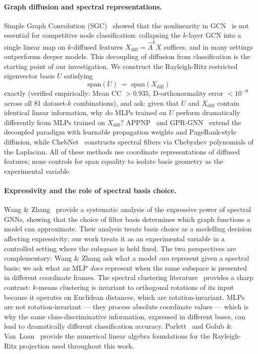 \documentclass[11pt]{article}
\begin{document}
\paragraph{Graph diffusion and spectral representations.}
Simple Graph Convolution (SGC)~\citep{wu2019simplifying} showed that the
nonlinearity in GCN~\citep{kipf2017semi} is not essential for competitive
node classification: collapsing the $k$-layer GCN into a single linear map
on $k$-diffused features $X_{\mathrm{diff}} = \hat{A}^k X$ suffices, and in
many settings outperforms deeper models.
This decoupling of diffusion from classification is the starting point of our
investigation.
We construct the Rayleigh-Ritz restricted eigenvector basis $U$ satisfying
\[
  \mathrm{span}(U) \;=\; \mathrm{span}(X_{\mathrm{diff}})
\]
exactly (verified empirically: Mean CC $> 0.935$, D-orthonormality error
$< 10^{-9}$ across all 81 dataset-$k$ combinations), and ask: given that
$U$ and $X_{\mathrm{diff}}$ contain identical linear information, why do MLPs
trained on $U$ perform dramatically differently from MLPs trained on
$X_{\mathrm{diff}}$?
APPNP~\citep{gasteiger2019predictpropagate} and
GPR-GNN~\citep{chien2021adaptive} extend the decoupled paradigm with learnable
propagation weights and PageRank-style diffusion, while
ChebNet~\citep{defferrard2016fastlocalized} constructs spectral filters via
Chebyshev polynomials of the Laplacian.
All of these methods use coordinate representations of diffused features;
none controls for span equality to isolate basis geometry as the experimental
variable.

\paragraph{Expressivity and the role of spectral basis choice.}
Wang \& Zhang~\citep{wang2022howpowerful} provide a systematic analysis of the
expressive power of spectral GNNs, showing that the choice of filter basis
determines which graph functions a model can approximate.
Their analysis treats basis choice as a modelling decision affecting
expressivity; our work treats it as an experimental variable in a controlled
setting where the subspace is held fixed.
The two perspectives are complementary: Wang \& Zhang ask what a model
\emph{can} represent given a spectral basis; we ask what an MLP \emph{does}
represent when the same subspace is presented in different coordinate frames.
The spectral clustering literature~\citep{vonluxburg2007tutorial} provides a
sharp contrast: $k$-means clustering is invariant to orthogonal rotations of
its input because it operates on Euclidean distances, which are
rotation-invariant.
MLPs are not rotation-invariant — they process absolute coordinate values —
which is why the same class-discriminative information, expressed in different
bases, can lead to dramatically different classification accuracy.
Parlett~\citep{parlett1980symmetric} and Golub \&
Van~Loan~\citep{golub2013matrixcomputations} provide the numerical linear
algebra foundations for the Rayleigh-Ritz projection used throughout this work.
\end{document}
